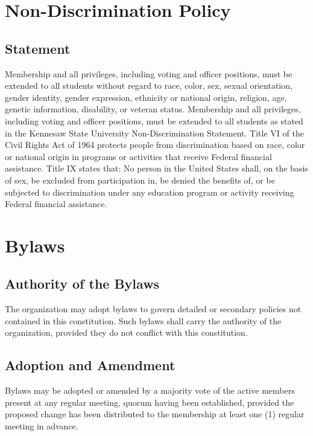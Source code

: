 \documentclass[12pt,letterpaper]{article} %
\begin{document}
\section{Non-Discrimination Policy}\label{art:non-discrimination} %
\subsection{Statement}\label{sec:non-discrimination-statement}
Membership and all privileges, including voting and officer positions, must be extended
to all students without regard to race, color, sex, sexual orientation, gender identity,
gender expression, ethnicity or national origin, religion, age, genetic information,
disability, or veteran status. Membership and all privileges, including voting and
officer positions, must be extended to all students as stated in the Kennesaw State
University Non-Discrimination Statement. Title VI of the Civil Rights Act of 1964 protects
people from discrimination based on race, color or national origin in programs or activities
that receive Federal financial assistance. Title IX states that: No person in the United
States shall, on the basis of sex, be excluded from participation in, be denied the
benefits of, or be subjected to discrimination under any education program or activity
receiving Federal financial assistance.

\section{Bylaws}\label{art:bylaws} %
\subsection{Authority of the Bylaws}\label{sec:bylaws-authority}
The organization may adopt bylaws to govern detailed or secondary policies not contained
in this constitution. Such bylaws shall carry the authority of the organization, provided
they do not conflict with this constitution.
\subsection{Adoption and Amendment}\label{sec:bylaws-amendment}
Bylaws may be adopted or amended by a majority vote of the active members present at any
regular meeting, quorum having been established, provided the proposed change has been
distributed to the membership at least one (1) regular meeting in advance.
\end{document}
